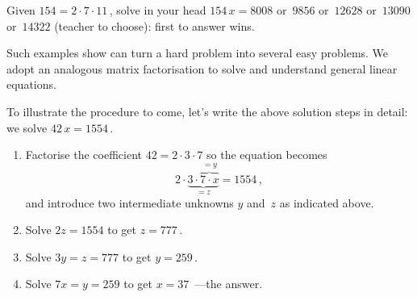 \begin{activity} \label{eg:}
Given \(154=2\cdot7\cdot11\)\,, solve in your head \(154\,x=8008\) or~\(9856\) or~\(12628\) or~\(13090\) or~\(14322\) (teacher to choose): first to answer wins.
\end{activity}

Such examples show  can turn a hard problem into several easy problems.  
We adopt an analogous matrix factorisation to solve and understand general linear equations.  

To illustrate the procedure to come, let's write the above solution steps in detail: we solve \(42\,x=1554\)\,.
\begin{enumerate}
\item Factorise the coefficient \(42=2\cdot3\cdot7\) so the equation becomes  
\begin{equation*}
2\cdot\underbrace{3\cdot\overbrace{7\cdot x}^{=y}}_{=z}=1554\,,
\end{equation*}
and introduce two intermediate unknowns \(y\) and~\(z\) as indicated above.
\item Solve \(2z=1554\) to get \(z=777\)\,.
\item Solve \(3y=z=777\) to get \(y=259\)\,.
\item Solve \(7x=y=259\) to get \(x=37\)\ ---the answer.
\end{enumerate}

